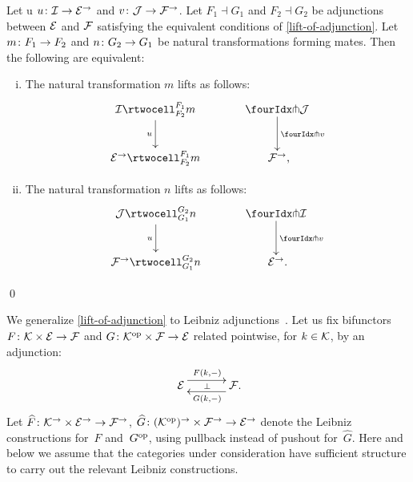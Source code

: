\documentclass[reqno,10pt,a4paper,oneside,draft]{amsart}
\begin{document}
{{\begin{proposition} \label{lift-of-mates}
Let u $u \co \cal{I} \to \catE^\to$ and $v \co \cal{J} \to \cal{F}^\to$.
Let $F_1 \dashv G_1$ and $F_2 \dashv G_2$ be adjunctions between $\cal{E}$ and $\cal{F}$ satisfying the equivalent conditions of \cref{lift-of-adjunction}.
Let $m \co F_1 \to F_2$ and $n \co G_2 \to G_1$ be natural transformations forming mates.
Then the following are equivalent:
\begin{enumerate}[(i)]
\item
The natural transformation $m$ lifts as follows:
\[
\xymatrix@C=1.2cm{
  \cal{I}
  \rtwocell_{F_2}^{F_1}{m}
  \ar[d]_{u}
&
  \liftl{\cal{J}}
  \ar[d]^{\liftl{v}}
\\
  \catE^\to
  \rtwocell_{F_2}^{F_1}{m}
&
  \cal{F}^\to
\rlap{,}}
\]
\item
The natural transformation $n$ lifts as follows:
\[
\xymatrix@C=1.2cm{
  \cal{J}
  \rtwocell_{G_1}^{G_2}{n}
  \ar[d]_{u}
&
  \liftr{\cal{I}}
  \ar[d]^{\liftl{v}}
\\
  \cal{F}^\to
  \rtwocell_{G_1}^{G_2}{n}
&
  \cal{E}^\to
\rlap{.}}
\]
\end{enumerate}
\qed
\end{proposition}



We generalize \cref{lift-of-adjunction} to Leibniz adjunctions~\cite{riehl-verity:reedy}.
Let us fix bifunctors $F \co \cal{K} \times \catE \to \cal{F}$ and $G \co \cal{K}^{\op} \times \cal{F} \to \catE$ related pointwise, for $k \in \cal{K}$, by an adjunction:
\[
\xymatrix@C+1em{
  \catE
  \ar@<5pt>[r]^{F(k, \arghole)}
  \ar@{}[r]|{\bot}
&
  \cal{F}
  \ar@<5pt>[l]^{G(k, \arghole)}
\rlap{.}}
\]
Let $ \widehat{F} \co \cal{K}^\to \times \catE^\to \to \cal{F}^\to$, 
$ \widehat{G} \co (\cal{K}^{\op})^\to \times \cal{F}^\to \to \catE^\to$
denote the Leibniz constructions for~$F$ and~$G^{\op}$, using pullback instead of pushout for~$\widehat{G}$.
Here and below we assume that the categories under consideration have sufficient structure to carry out
the relevant Leibniz constructions. 

}}
\end{document}
